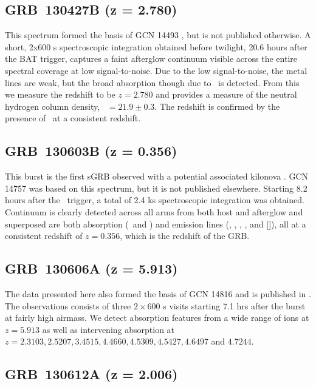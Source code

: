 \documentclass{aa}    %
\begin{document}
\subsection{GRB~130427B (z = 2.780)} \label{130427}

This spectrum formed the basis of GCN 14493 \citep{GCN14493}, but is not
published otherwise. A short, 2x600 s spectroscopic integration obtained before
twilight, 20.6 hours after the BAT trigger, captures a faint afterglow continuum
visible across the entire spectral coverage at low signal-to-noise. Due to the
low signal-to-noise, the metal lines are weak, but the broad absorption though
due to \lya~is detected. From this we measure the redshift to be $z = 2.780$ and
provides a measure of the neutral hydrogen column density, \nh~$= 21.9 \pm 0.3$.
The redshift is confirmed by the presence of \feii~at a consistent redshift.

\subsection{GRB~130603B (z = 0.356)}\label{130603}

This burst is the first sGRB observed with a potential associated
kilonova \citep{Tanvir2013a, Berger2013a}.  GCN 14757 \citep{GCN14757} was based
on this spectrum, but it is not published elsewhere. Starting 8.2 hours after
the \swift~trigger, a total of 2.4 ks spectroscopic integration was obtained.
Continuum is clearly detected across all arms from both host and afterglow and
superposed are both absorption (\cahk~and \mgii) and emission lines (\oii, \hb,
\oiii, \ha, and [\sii]), all at a consistent redshift of $z = 0.356$, which is the
redshift of the GRB.

\subsection{GRB~130606A (z = 5.913)}\label{130606}

The data presented here also formed the basis of GCN 14816 \citep{GCN14816} and
is published in \citet{Hartoog2015}. The observations consists of three
$2\times600$ s visits starting 7.1 hrs after the burst at fairly high airmass.
We detect absorption features from a wide range of ions at $z=5.913$ as well as
intervening absorption at $z=2.3103, 2.5207, 3.4515, 4.4660, 4.5309, 4.5427,
4.6497 $ and $ 4.7244$.


\subsection{GRB~130612A (z = 2.006)}\label{130612}
\end{document}
